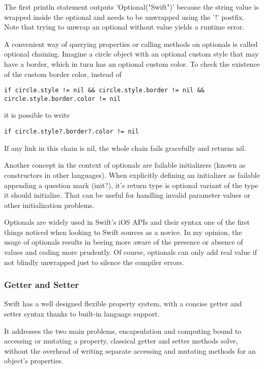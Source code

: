 The first println statement outputs 'Optional("Swift")' because the string value is wrapped inside the optional and needs to be unwrapped using the '!' postfix. Note that trying to unwrap an optional without value yields a runtime error.

A convenient way of querying properties or calling methods on optionals is called optional chaining. Imagine a circle object with an optional custom style that may have a border, which in turn has an optional custom color. To check the existence of the custom border color, instead of

\begin{lstlisting}[frame=none]
if circle.style != nil && circle.style.border != nil && circle.style.border.color != nil
\end{lstlisting}

it is possible to write

\begin{lstlisting}[frame=none]
if circle.style?.border?.color != nil
\end{lstlisting}

If any link in this chain is nil, the whole chain fails gracefully and returns nil.

Another concept in the context of optionals are failable initializers (known as constructors in other languages). When explicitly defining an initializer as failable appending a question mark (init?), it's return type is optional variant of the type it should initialize. That can be useful for handling invalid parameter values or other initialization problems.

Optionals are widely used in Swift's iOS APIs and their syntax one of the first things noticed when looking to Swift sources as a novice.  
In my opinion, the usage of optionals results in beeing more aware of the presence or absence of values and coding more prudently. Of course, optionals can only add real value if not blindly unwrapped just to silence the compiler errors.  


\subsubsection{Getter and Setter}

Swift has a well designed flexible property system, with a concise getter and setter syntax thanks to built-in language support. 

It addresses the two main problems, encapsulation and computing bound to accessing or mutating a property, classical getter and setter methods solve, without the overhead of writing separate accessing and mutating methods for an object's properties.


